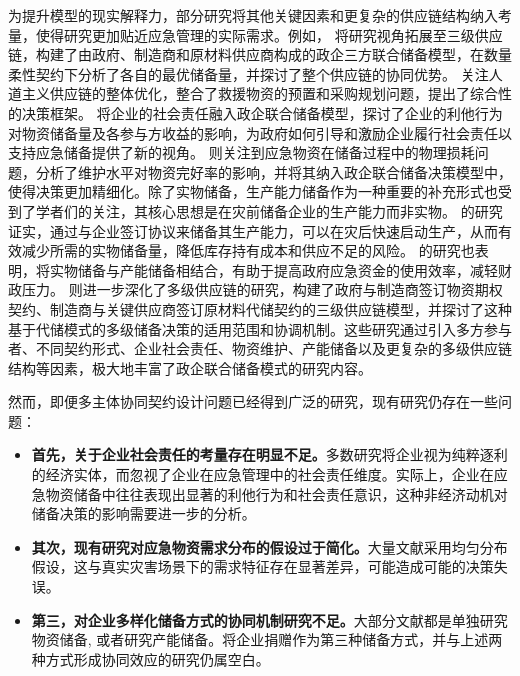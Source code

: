 \documentclass[a4paper,8pt,twocolumn]{article} %
\begin{document}
为提升模型的现实解释力，部分研究将其他关键因素和更复杂的供应链结构纳入考量，使得研究更加贴近应急管理的实际需求。例如，\parencite{Gong2024Quantity} 将研究视角拓展至三级供应链，构建了由政府、制造商和原材料供应商构成的政企三方联合储备模型，在数量柔性契约下分析了各自的最优储备量，并探讨了整个供应链的协同优势。\parencite{torabi2018integrated} 关注人道主义供应链的整体优化，整合了救援物资的预置和采购规划问题，提出了综合性的决策框架。\parencite{Zheng2023CSR} 将企业的社会责任融入政企联合储备模型，探讨了企业的利他行为对物资储备量及各参与方收益的影响，为政府如何引导和激励企业履行社会责任以支持应急储备提供了新的视角。\parencite{wang2023考虑维护水平} 则关注到应急物资在储备过程中的物理损耗问题，分析了维护水平对物资完好率的影响，并将其纳入政企联合储备决策模型中，使得决策更加精细化。除了实物储备，生产能力储备作为一种重要的补充形式也受到了学者们的关注，其核心思想是在灾前储备企业的生产能力而非实物。\parencite{hu2018考虑企业生产能力} 的研究证实，通过与企业签订协议来储备其生产能力，可以在灾后快速启动生产，从而有效减少所需的实物储备量，降低库存持有成本和供应不足的风险。\parencite{zhang2016emergency} 的研究也表明，将实物储备与产能储备相结合，有助于提高政府应急资金的使用效率，减轻财政压力。\parencite{jiang2024基于代储模式} 则进一步深化了多级供应链的研究，构建了政府与制造商签订物资期权契约、制造商与关键供应商签订原材料代储契约的三级供应链模型，并探讨了这种基于代储模式的多级储备决策的适用范围和协调机制。这些研究通过引入多方参与者、不同契约形式、企业社会责任、物资维护、产能储备以及更复杂的多级供应链结构等因素，极大地丰富了政企联合储备模式的研究内容。

然而，即便多主体协同契约设计问题已经得到广泛的研究，现有研究仍存在一些问题：
\begin{itemize}
    \item \textbf{首先，关于企业社会责任的考量存在明显不足。}多数研究将企业视为纯粹逐利的经济实体\cite{Li2022Stackelberg,Chen2023Contract}，而忽视了企业在应急管理中的社会责任维度。实际上，企业在应急物资储备中往往表现出显著的利他行为和社会责任意识\cite{Zheng2023CSR}，这种非经济动机对储备决策的影响需要进一步的分析。
    \item \textbf{其次，现有研究对应急物资需求分布的假设过于简化。}大量文献采用均匀分布假设\cite{chai2021考虑储备周期,chen2014突发事件灾前应急物资政企联合储备模式}，这与真实灾害场景下的需求特征存在显著差异，可能造成可能的决策失误。
    \item \textbf{第三，对企业多样化储备方式的协同机制研究不足。}大部分文献都是单独研究物资储备\cite{Li2022Stackelberg, li2022政企联合储备,Chen2023Contract}, 或者研究产能储备\cite{Gong2024Quantity}。将企业捐赠作为第三种储备方式，并与上述两种方式形成协同效应的研究仍属空白。
\end{itemize}
\end{document}
